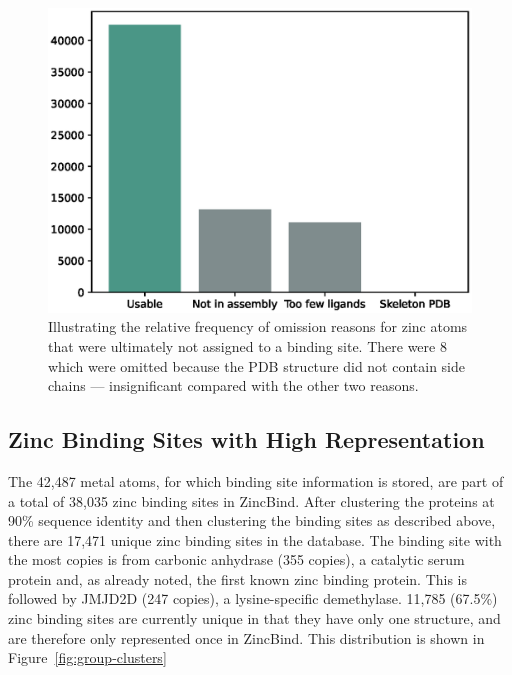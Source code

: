 \begin{figure}
\centering
\includegraphics[width=1.0\textwidth]{Figures/omission.eps}
\caption[The relative frequency of omission reasons for zinc
atoms that were ultimately not assigned to a binding site.]{\label{fig:omission} Illustrating the relative frequency of omission reasons for zinc
atoms that were ultimately not assigned to a binding site. There were 8 which were omitted because
the PDB structure did not contain side chains --- insignificant compared with the other two reasons.}
\end{figure}

\subsection{Zinc Binding Sites with High Representation}

The 42,487 metal atoms, for which binding site information is stored, are part of a total of 38,035 zinc binding sites in ZincBind. After clustering the proteins at 90\% sequence identity and then clustering the binding sites as described above, there are 17,471 unique zinc binding sites in the database. The binding site with the most copies is from carbonic anhydrase (355 copies), a catalytic serum protein and, as already noted, the first known zinc binding protein. This is followed by JMJD2D (247 copies), a lysine-specific demethylase. 11,785 (67.5\%) zinc binding sites are currently unique in that they have only one structure, and are therefore only represented once in ZincBind. This distribution is shown in Figure~\ref{fig:group-clusters}

